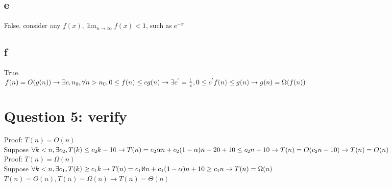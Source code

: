 \documentclass[]{article}
\begin{document}
\subsection{e}
False, consider any $f(x), \lim_{n \rightarrow \infty} f(x) < 1$, such as $e^{-x}$

\subsection{f}
True.\\
$
f(n) = O(g(n)) \rightarrow \exists c, n_{0}, \forall n > n_{0}, 0 \le f(n) \le cg(n)\\
\rightarrow \exists c^{'} = \frac{1}{c}, 0 \le c^{'}f(n) \le g(n)\\
\rightarrow g(n) = \Omega (f(n))
$
\section{Question 5: verify}
Proof: $ T(n) = O(n)$ \\
Suppose $\forall k<n, \exists c_{2}, T(k) \le c_{2}k - 10\\
\rightarrow T(n) = c_{2}\alpha n + c_{2}(1-\alpha) n - 20 + 10 \le c_{2}n - 10\\
\rightarrow T(n) = O(c_{2}n-10)\\
\rightarrow T(n) = O(n)\\$
\\
Proof: $ T(n) = \Omega(n)$ \\
Suppose $\forall k<n, \exists c_{1}, T(k) \ge c_{1}k\\
\rightarrow T(n) = c_{1}\aleph n + c_{1}(1-\alpha) n + 10 \ge c_{1}n\\
\rightarrow T(n) = \Omega(n)\\$
\\
$T(n) = O(n), T(n) = \Omega(n) \rightarrow T(n) = \Theta(n)$
\end{document}
